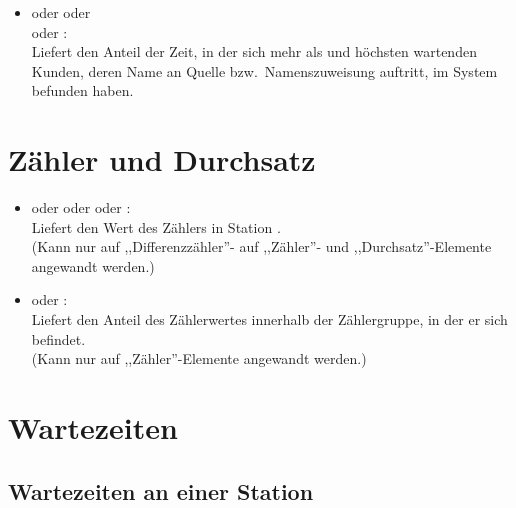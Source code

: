 \begin{itemize}
\item
{} oder  oder\\  oder :\\
Liefert den Anteil der Zeit, in der sich mehr als  und höchsten  wartenden Kunden, deren Name an Quelle bzw.\ Namenszuweisung  auftritt, im System befunden haben.

\end{itemize}





\section{Zähler und Durchsatz}

\begin{itemize}

\item
{} oder  oder  oder :\\
Liefert den Wert des Zählers in Station .\\
(Kann nur auf ,,Differenzzähler''- auf ,,Zähler''- und ,,Durchsatz''-Elemente angewandt werden.)

\item
{} oder :\\
Liefert den Anteil des Zählerwertes innerhalb der Zählergruppe, in der er sich befindet.\\
(Kann nur auf ,,Zähler''-Elemente angewandt werden.)

\end{itemize}  



\section{Wartezeiten}



\subsection{Wartezeiten an einer Station}

